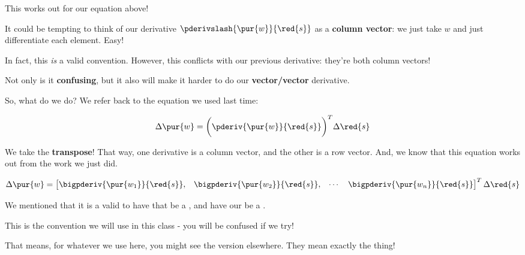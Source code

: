         This works out for our equation above!
        
        It could be tempting to think of our derivative $\pderivslash{ \pur{w} }{ \red{s} }$ as a \textbf{column vector}: we just take $w$ and just differentiate each element. Easy!
        
        In fact, this \textit{is} a valid convention. However, this conflicts with our previous derivative: they're both column vectors! 
        
        Not only is it \textbf{confusing}, but it also will make it harder to do our \textbf{vector/vector} derivative.
        
        So, what do we do? We refer back to the equation we used last time:
        
        \begin{equation}
            \Delta \pur{w}
            =
            \bigg(
                \pderiv{ \pur{w} }{ \red{s} } 
            \bigg)^T
            \Delta \red{s}
        \end{equation}
        
        We take the \textbf{transpose}! That way, one derivative is a column vector, and the other is a row vector. And, we know that this equation works out from the work we just did.
        
        \begin{equation}
            \Delta \pur{w}
            =
                \begin{bmatrix}
                    \bigpderiv{ \pur{w_1} }{ \red{s} }, &
                    \bigpderiv{ \pur{w_2} }{ \red{s} }, &
                    \cdots &
                    \bigpderiv{ \pur{w_n} }{ \red{s} } 
                \end{bmatrix}
            ^T
            \Delta \red{s}
        \end{equation}
        
        \begin{clarification}
            We mentioned that it is a valid  to have that  be a , and have our  be a .
            
            This is  the convention we will use in this class - you will be confused if we try!
            
            That means, for whatever  we use here, you might see the  version elsewhere. They mean exactly the  thing!
        \end{clarification}
        
